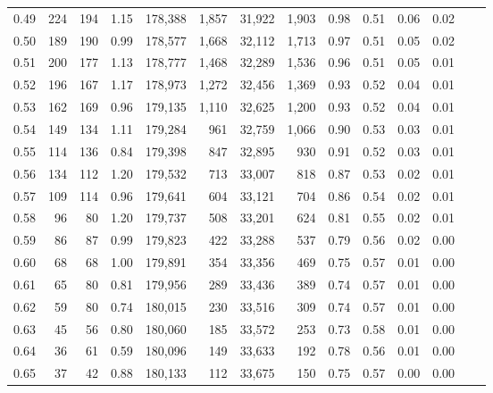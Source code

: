 \begin{tabular}{rrrrrrrrrrrrrr}
0.49 &     224 &    194 &    1.15 &  178,388 &    1,857 &  31,922 &   1,903 &  0.98 &  0.51 &  0.06 &      0.02 \\
0.50 &     189 &    190 &    0.99 &  178,577 &    1,668 &  32,112 &   1,713 &  0.97 &  0.51 &  0.05 &      0.02 \\
0.51 &     200 &    177 &    1.13 &  178,777 &    1,468 &  32,289 &   1,536 &  0.96 &  0.51 &  0.05 &      0.01 \\
0.52 &     196 &    167 &    1.17 &  178,973 &    1,272 &  32,456 &   1,369 &  0.93 &  0.52 &  0.04 &      0.01 \\
0.53 &     162 &    169 &    0.96 &  179,135 &    1,110 &  32,625 &   1,200 &  0.93 &  0.52 &  0.04 &      0.01 \\
0.54 &     149 &    134 &    1.11 &  179,284 &      961 &  32,759 &   1,066 &  0.90 &  0.53 &  0.03 &      0.01 \\
0.55 &     114 &    136 &    0.84 &  179,398 &      847 &  32,895 &     930 &  0.91 &  0.52 &  0.03 &      0.01 \\
0.56 &     134 &    112 &    1.20 &  179,532 &      713 &  33,007 &     818 &  0.87 &  0.53 &  0.02 &      0.01 \\
0.57 &     109 &    114 &    0.96 &  179,641 &      604 &  33,121 &     704 &  0.86 &  0.54 &  0.02 &      0.01 \\
0.58 &      96 &     80 &    1.20 &  179,737 &      508 &  33,201 &     624 &  0.81 &  0.55 &  0.02 &      0.01 \\
0.59 &      86 &     87 &    0.99 &  179,823 &      422 &  33,288 &     537 &  0.79 &  0.56 &  0.02 &      0.00 \\
0.60 &      68 &     68 &    1.00 &  179,891 &      354 &  33,356 &     469 &  0.75 &  0.57 &  0.01 &      0.00 \\
0.61 &      65 &     80 &    0.81 &  179,956 &      289 &  33,436 &     389 &  0.74 &  0.57 &  0.01 &      0.00 \\
0.62 &      59 &     80 &    0.74 &  180,015 &      230 &  33,516 &     309 &  0.74 &  0.57 &  0.01 &      0.00 \\
0.63 &      45 &     56 &    0.80 &  180,060 &      185 &  33,572 &     253 &  0.73 &  0.58 &  0.01 &      0.00 \\
0.64 &      36 &     61 &    0.59 &  180,096 &      149 &  33,633 &     192 &  0.78 &  0.56 &  0.01 &      0.00 \\
0.65 &      37 &     42 &    0.88 &  180,133 &      112 &  33,675 &     150 &  0.75 &  0.57 &  0.00 &      0.00 \\

\end{tabular}
